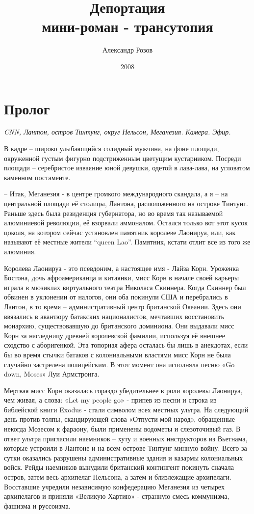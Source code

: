 \documentclass{book}
\title{Депортация\\мини-роман - трансутопия}
\author{Александр Розов}
\date{2008}
\newcommand{\myblock}[1] {
 {
   \begin{flushright}
    \parbox{2in}{{\small \textit{#1}}}
   \end{flushright}
 }
}
\begin{document}
\maketitle

\chapter*{Пролог}
\myblock{CNN, Лантон, остров Тинтунг, округ Нельсон, Меганезия. Камера. Эфир.}

В кадре -- широко улыбающийся солидный мужчина, на фоне площади, окруженной густым фигурно подстриженным цветущим кустарником. Посреди площади -- серебристое изваяние юной девушки, одетой в лава-лава, на угловатом каменном постаменте.

-- Итак, Меганезия - в центре громкого международного скандала, а я -- на центральной площади её столицы, Лантона, расположенного на острове Тинтунг. Раньше здесь была резиденция губернатора, но во время так называемой алюминиевой революции, её взорвали аммоналом. Остался только вот этот кусок цоколя, на котором сейчас установлен памятник королеве Лаонируа, или, как называют её местные жители ``queen Lao''. Памятник, кстати отлит все из того же алюминия.

Королева Лаонируа - это псевдоним, а настоящее имя - Лайза Корн. Уроженка Бостона, дочь афроамериканца и китаянки, мисс Корн в начале своей карьеры играла в мюзиклах виртуального театра Николаса Скиннера. Когда Скиннер был обвинен в уклонении от налогов, они оба покинули США и перебрались в Лантон, в то время -- административный центр британской Океании. Здесь они ввязались в авантюру батакских националистов, мечтавших восстановить монархию, существовавшую до британского доминиона. Они выдавали мисс Корн за наследницу древней королевской фамилии, используя её внешнее сходство с аборигенкой. Эта топорная афера осталась бы лишь в анекдотах, если бы во время стычки батаков с колониальными властями мисс Корн не была случайно застрелена полицейским. В этот момент она исполняла песню «Go down, Moses» Луи Армстронга.

Мертвая мисс Корн оказалась гораздо убедительнее в роли королевы Лаонируа, чем живая, а слова: «Let my people go» - припев из песни и строка из библейской книги Exodus - стали символом всех местных ультра. На следующий день против толпы, скандирующей слова «Отпусти мой народ», обращенные некогда Мозесом к фараону, были применены водометы и слезоточивый газ. В ответ ультра пригласили наемников -- хуту и военных инструкторов из Вьетнама, которые устроили в Лантоне и на всем острове Тинтунг минную войну. Всего за сутки оказались разрушены административные здания и казармы колониальных войск. Рейды наемников вынудили британский контингент покинуть сначала остров, затем весь архипелаг Нельсона, а затем и близлежащие архипелаги. Восставшие учредили независимую конфедерацию Меганезия из четырех архипелагов и приняли «Великую Хартию» - странную смесь коммунизма, фашизма и руссоизма.
\end{document}
